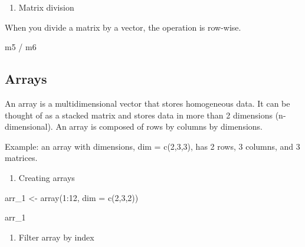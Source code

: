 \documentclass[
  letterpaper,
  DIV=11,
  numbers=noendperiod]{scrreprt}
\newenvironment{Shaded}{}{}
\newcommand{\AttributeTok}[1]{\textcolor[rgb]{0.84,0.23,0.29}{#1}}
\newcommand{\DecValTok}[1]{\textcolor[rgb]{0.00,0.36,0.77}{#1}}
\newcommand{\FunctionTok}[1]{\textcolor[rgb]{0.44,0.26,0.76}{#1}}
\newcommand{\NormalTok}[1]{\textcolor[rgb]{0.14,0.16,0.18}{#1}}
\newcommand{\OtherTok}[1]{\textcolor[rgb]{0.44,0.26,0.76}{#1}}
\newcommand{\SpecialCharTok}[1]{\textcolor[rgb]{0.00,0.36,0.77}{#1}}
\providecommand{\tightlist}{%
  \setlength{\itemsep}{0pt}\setlength{\parskip}{0pt}}\usepackage{longtable,booktabs,array}
\begin{document}
\begin{enumerate}
\def\labelenumi{\roman{enumi}.}
\tightlist
\item
  Matrix division
\end{enumerate}

When you divide a matrix by a vector, the operation is row-wise.

\begin{Shaded}
\begin{Highlighting}[]
\NormalTok{m5 }\SpecialCharTok{/}\NormalTok{ m6}
\end{Highlighting}
\end{Shaded}

\subsection{Arrays}\label{arrays}

An array is a multidimensional vector that stores homogeneous data. It
can be thought of as a stacked matrix and stores data in more than 2
dimensions (n-dimensional). An array is composed of rows by columns by
dimensions.

Example: an array with dimensions, dim = c(2,3,3), has 2 rows, 3
columns, and 3 matrices.

\begin{enumerate}
\def\labelenumi{\alph{enumi}.}
\setcounter{enumi}{1}
\tightlist
\item
  Creating arrays
\end{enumerate}

\begin{Shaded}
\begin{Highlighting}[]
\NormalTok{arr\_1 }\OtherTok{\textless{}{-}} \FunctionTok{array}\NormalTok{(}\DecValTok{1}\SpecialCharTok{:}\DecValTok{12}\NormalTok{, }\AttributeTok{dim =} \FunctionTok{c}\NormalTok{(}\DecValTok{2}\NormalTok{,}\DecValTok{3}\NormalTok{,}\DecValTok{2}\NormalTok{))}
\end{Highlighting}
\end{Shaded}

\begin{Shaded}
\begin{Highlighting}[]
\NormalTok{arr\_1}
\end{Highlighting}
\end{Shaded}

\begin{enumerate}
\def\labelenumi{\alph{enumi}.}
\setcounter{enumi}{1}
\tightlist
\item
  Filter array by index
\end{enumerate}
\end{document}
